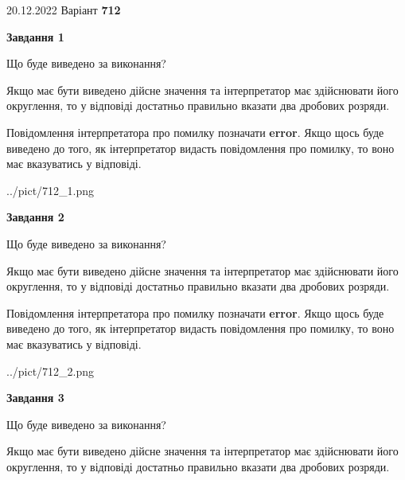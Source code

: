\documentclass[12pt, ukrainian]{article}
\begin{document}
{20.12.2022 Варіант \No \textbf { 712 }\par}
{
\begin {Large}

{\begin {center}\textbf{Завдання 1}\end {center}}\par
Що буде виведено за виконання? \par

Якщо має бути виведено дійсне значення та інтерпретатор має здійснювати його округлення, 
то у відповіді достатньо правильно вказати два дробових розряди.

Повідомлення інтерпретатора про помилку позначати \textbf{error}.
Якщо щось буде виведено до того, як інтерпретатор видасть повідомлення про помилку, 
то воно має вказуватись у відповіді. \par

\begin{center}
	{../pict/712_1.png}
\end{center}
\newpage

{\begin {center}\textbf{Завдання 2}\end {center}}\par
Що буде виведено за виконання? \par

Якщо має бути виведено дійсне значення та інтерпретатор має здійснювати його округлення, 
то у відповіді достатньо правильно вказати два дробових розряди.

Повідомлення інтерпретатора про помилку позначати \textbf{error}.
Якщо щось буде виведено до того, як інтерпретатор видасть повідомлення про помилку, 
то воно має вказуватись у відповіді. \par

\begin{center}
	{../pict/712_2.png}
\end{center}
\newpage

{\begin {center}\textbf{Завдання 3}\end {center}}\par
Що буде виведено за виконання? \par

Якщо має бути виведено дійсне значення та інтерпретатор має здійснювати його округлення, 
то у відповіді достатньо правильно вказати два дробових розряди.


\end{Large}}
\end{document}
